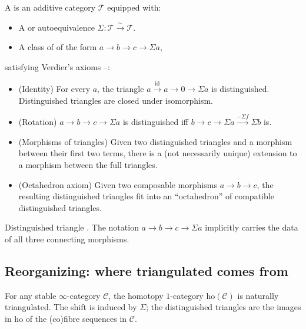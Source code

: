 \begin{definition}
\label{def:triangulated}
A  is an additive category $\mathcal{T}$
equipped with:
\begin{itemize}
  \item A  or  autoequivalence $\Sigma :
        \mathcal{T} \xrightarrow{\sim} \mathcal{T}$.
  \item A class of  of the form
        $a \to b \to c \to \Sigma a$,
\end{itemize}
satisfying Verdier's axioms --:
\begin{itemize}
  \item[\textbf{TR1}] (Identity) For every $a$, the triangle $a \xrightarrow{\mathrm{id}}
        a \to 0 \to \Sigma a$ is distinguished. Distinguished triangles
        are closed under isomorphism.
  \item[\textbf{TR2}] (Rotation) $a \to b \to c \to \Sigma a$ is distinguished
        iff $b \to c \to \Sigma a \xrightarrow{-\Sigma f} \Sigma b$ is.
  \item[\textbf{TR3}] (Morphisms of triangles) Given two distinguished
        triangles and a morphism between their first two terms, there
        is a (not necessarily unique) extension to a morphism between
        the full triangles.
  \item[\textbf{TR4}] (Octahedron axiom) Given two composable morphisms
        $a \to b \to c$, the resulting distinguished triangles fit into
        an ``octahedron'' of compatible distinguished triangles.
\end{itemize}
\end{definition}

\begin{howtosay}
Distinguished triangle .
The notation $a \to b \to c \to \Sigma a$ implicitly carries the data of
all three connecting morphisms.
\end{howtosay}

\subsection{Reorganizing: where triangulated comes from}

\begin{theorem}
\label{thm:ho-stable-triangulated}
For any stable $\infty$-category $\mathcal{C}$, the homotopy $1$-category
$\mathrm{ho}(\mathcal{C})$ is naturally triangulated. The shift is induced
by $\Sigma$; the distinguished triangles are the images in $\mathrm{ho}$
of the (co)fibre sequences in $\mathcal{C}$.
\end{theorem}

